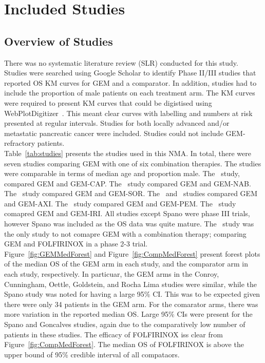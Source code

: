 \chapter{Included Studies}\label{trialschap}

\section{Overview of Studies}
There was no systematic literature review (SLR) conducted for this study. Studies were searched using Google Scholar to identify Phase II/III studies that reported OS KM curves for GEM and a comparator. In addition, studies had to include the proportion of male patients on each treatment arm. The KM curves were required to present KM curves that could be digistised using WebPlotDigitizer~\cite{wpd}. This meant clear curves with labelling and numbers at risk presented at regular intervals. Studies for both locally advanced and/or metastatic pancreatic cancer were included. Studies could not include GEM-refractory patients.\\

Table~\ref{tab:studies} presents the studies used in this NMA. In total, there were seven studies comparing GEM with one of six combination therapies. The studies were comparable in terms of median age and proportion male. The~\cite{cunningham2009} study, compared GEM and GEM-CAP. The~\cite{goldstein2015} study compared GEM and GEM-NAB. The~\cite{gonccalves2012} study compared GEM and GEM-SOR. The~\cite{kindler2011} and~\cite{spano2008} studies compared GEM and GEM-AXI. The~\cite{oettle2005} study compared GEM and GEM-PEM. The~\cite{rocha2004} study comapred GEM and GEM-IRI. All studies except Spano were phase III trials, however Spano was included as the OS data was quite mature. The~\cite{conroy} study was the only study to not comapre GEM with a combination therapy; comparing GEM and FOLFIRINOX in a phase 2-3 trial.\\

Figure~\ref{fig:GEMMedForest} and Figure~\ref{fig:CompMedForest} present forest plots of the median OS of the GEM arm in each study, and the comparator arm in each study, respectively. In particuar, the GEM arms in the Conroy, Cunningham, Oettle, Goldstein, and Rocha Lima studies were similar, while the Spano study was noted for having a large 95\% CI. This was to be expected given there were only 34 patients in the GEM arm. For the comarator arms, there was more variation in the reported median OS. Large 95\% CIs were present for the Spano and Goncalves studies, again due to the comparatively low number of patients in these studies. The efficacy of FOLFIRINOX iss clear from Figure~\ref{fig:CompMedForest}. The median OS of FOLFIRINOX is above the upper bound of 95\% credible interval of all compataors. \\

